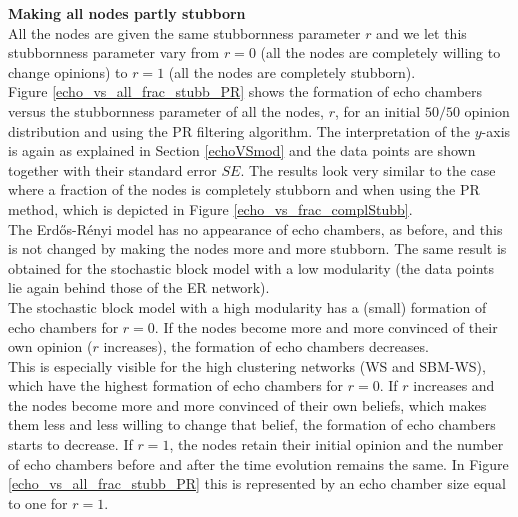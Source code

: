 \documentclass[11 pt , letterpaper , twoside , openright]{book}
\begin{document}
\noindent
\textbf{Making all nodes partly stubborn}\\
\newline
All the nodes are given the same stubbornness parameter $r$ and we let this stubbornness parameter vary from $r = 0$ (all the nodes are completely willing to change opinions) to $r=1$ (all the nodes are completely stubborn).\\
\newline
Figure \ref{echo_vs_all_frac_stubb_PR} shows the formation of echo chambers versus the stubbornness parameter of all the nodes, $r$, for an initial $50/50$ opinion distribution and using the PR filtering algorithm. The interpretation of the $y$-axis is again as explained in Section \ref{echoVSmod} and the data points are shown together with their standard error $SE$. The results look very similar to the case where a fraction of the nodes is completely stubborn and when using the PR method, which is depicted in Figure \ref{echo_vs_frac_complStubb}.\\
The Erd\H{o}s-R\'{e}nyi model has no appearance of echo chambers, as before, and this is not changed by making the nodes more and more stubborn. The same result is obtained for the stochastic block model with a low modularity (the data points lie again behind those of the ER network).\\
The stochastic block model with a high modularity has a (small) formation of echo chambers for $r=0$. If the nodes become more and more convinced of their own opinion ($r$ increases), the formation of echo chambers decreases.\\
This is especially visible for the high clustering networks (WS and SBM-WS), which have the highest formation of echo chambers for $r=0$. If $r$ increases and the nodes become more and more convinced of their own beliefs, which makes them less and less willing to change that belief, the formation of echo chambers starts to decrease. If $r=1$, the nodes retain their initial opinion and the number of echo chambers before and after the time evolution remains the same. In Figure \ref{echo_vs_all_frac_stubb_PR} this is represented by an echo chamber size equal to one for $r=1$.
\end{document}
